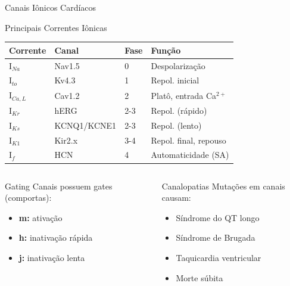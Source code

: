 \begin{frame}{Canais Iônicos Cardíacos}
\begin{block}{Principais Correntes Iônicas}
\begin{center}
\begin{tabular}{llll}
\toprule
\textbf{Corrente} & \textbf{Canal} & \textbf{Fase} & \textbf{Função} \\
\midrule
I$_{Na}$ & Nav1.5 & 0 & Despolarização \\
I$_{to}$ & Kv4.3 & 1 & Repol. inicial \\
I$_{Ca,L}$ & Cav1.2 & 2 & Platô, entrada Ca$^{2+}$ \\
I$_{Kr}$ & hERG & 2-3 & Repol. (rápido) \\
I$_{Ks}$ & KCNQ1/KCNE1 & 2-3 & Repol. (lento) \\
I$_{K1}$ & Kir2.x & 3-4 & Repol. final, repouso \\
I$_{f}$ & HCN & 4 & Automaticidade (SA) \\
\bottomrule
\end{tabular}
\end{center}
\end{block}

\vspace{0.3cm}

\begin{columns}
\begin{exampleblock}{Gating}
Canais possuem gates (comportas):
\begin{itemize}
    \item \textbf{m:} ativação
    \item \textbf{h:} inativação rápida
    \item \textbf{j:} inativação lenta
\end{itemize}
\end{exampleblock}

\begin{alertblock}{Canalopatias}
Mutações em canais causam:
\begin{itemize}
    \item Síndrome do QT longo
    \item Síndrome de Brugada
    \item Taquicardia ventricular
    \item Morte súbita
\end{itemize}
\end{alertblock}
\end{columns}
\end{frame}

